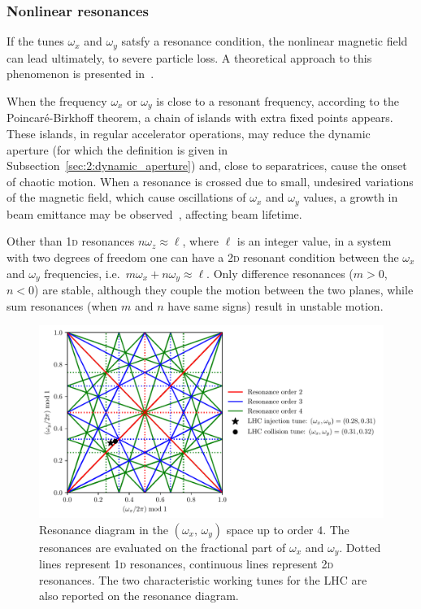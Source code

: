 \subsubsection{Nonlinear resonances}

If the tunes $\omega_x$ and $\omega_y$ satsfy a resonance condition, the nonlinear magnetic field can lead ultimately, to severe particle loss. A theoretical approach to this phenomenon is presented in~\cite{wilson}.

When the frequency $\omega_x$ or $\omega_y$ is close to a resonant frequency, according to the Poincaré-Birkhoff theorem, a chain of islands with extra fixed points appears. These islands, in regular accelerator operations, may reduce the dynamic aperture (for which the definition is given in Subsection~\ref{sec:2:dynamic_aperture}) and, close to separatrices, cause the onset of chaotic motion. When a resonance is crossed due to small, undesired variations of the magnetic field, which cause oscillations of $\omega_x$ and $\omega_y$ values, a growth in beam emittance may be observed~\cite{Guignard:185921}, affecting beam lifetime.

Other than 1\textsc{d} resonances $n\omega_z \approx \ell$, where $\ell$ is an integer value, in a system with two degrees of freedom one can have a 2\textsc{d} resonant condition between the $\omega_x$ and $\omega_y$ frequencies, i.e.\ $m\omega_x+n\omega_y\approx \ell$. Only difference resonances ($m>0$, $n<0$) are stable, although they couple the motion between the two planes, while sum resonances (when $m$ and $n$ have same signs) result in unstable motion.

\begin{figure}
	\centering
	\includegraphics[width=.85\textwidth]{2_accelerator_physics_fundamentals/figs/tune_space.pdf}
	\caption{Resonance diagram in the $(\omega_x,\,\omega_y)$ space up to order $4$. The resonances are evaluated on the fractional part of $\omega_x$ and $\omega_y$. Dotted lines represent 1\textsc{d} resonances, continuous lines represent 2\textsc{d} resonances. The two characteristic working tunes for the LHC are also reported on the resonance diagram.}
	\label{fig:res}
\end{figure}


